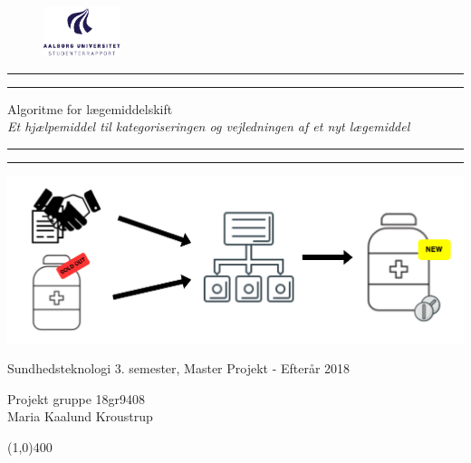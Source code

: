 \clearpage
\thispagestyle{empty}

\begin{figure}[H]
	\raggedleft
	\includegraphics[width=0.2\textwidth]{billeder/aau_logo_da.pdf}
\end{figure} 

\begin{center}	
	\rule{\textwidth}{1.6pt}\vspace*{-\baselineskip}\vspace*{2pt} %
	\rule{\textwidth}{0.4pt} %
	
	\vspace{0.75\baselineskip} %
	
	{\Huge Algoritme for lægemiddelskift} \\ \vspace{3mm}%
	{\Large\textit{Et hjælpemiddel til kategoriseringen og vejledningen af et nyt lægemiddel}}
	\vspace{0.75\baselineskip} %
	
	\rule{\textwidth}{0.4pt}\vspace*{-\baselineskip}\vspace{3.2pt} %
	\rule{\textwidth}{1.6pt} %
	
	\vspace{3.5\baselineskip} %
		\includegraphics[width=1\textwidth]{billeder/forside.png} \\
		\vspace{3cm}
	 		\begin{Large}
	 		Sundhedsteknologi 3. semester, Master Projekt - Efterår 2018\\
		\vspace{1cm}
			\end{Large}
	{\large Projekt gruppe 18gr9408 \\
	Maria Kaalund Kroustrup}
\end{center}
\vspace*{\fill}

\begin{center}
	\line(1,0){400}
\end{center}



